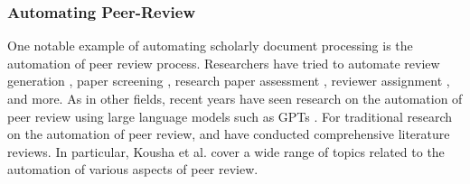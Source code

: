 \subsubsection{Automating Peer-Review}
One notable example of automating scholarly document processing is the automation of peer review process. Researchers have tried to automate review generation \cite{yuan2022can,yuan2022kid,wang2020reviewrobot}, paper screening \cite{schulz2022future}, research paper assessment \cite{kousha2022artificial}, reviewer assignment \cite{zhao2022reviewer}, and more. As in other fields, recent years have seen research on the automation of peer review using large language models such as GPTs \cite{wexin2023can,liu2023reviewergpt,robertson2023gpt4,hosseini2023fighting}. For traditional research on the automation of peer review, \cite{kousha2022artificial} and \cite{lin2021automated1} have conducted comprehensive literature reviews. In particular, Kousha et al. cover a wide range of topics related to the automation of various aspects of peer review.




